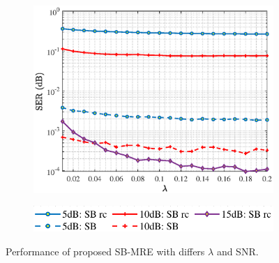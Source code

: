 \begin{figure}
    \centering
    \begin{subfigure}
         \centering
         \includegraphics[width=.8\linewidth]{figures/vary_lambda.eps}
     \end{subfigure}
     \hfill
     \begin{subfigure}
         \centering
         \includegraphics[width=.6\linewidth]{figures/legend_1.pdf}
     \end{subfigure}
     \hfill
    \caption{Performance of proposed SB-MRE with differs $\lambda$ and SNR.}
    \label{fig:vary_lambda}
\end{figure}